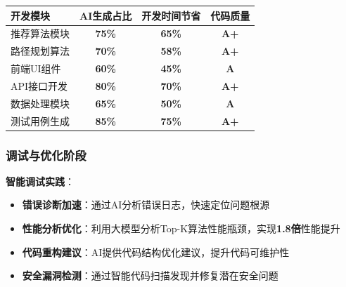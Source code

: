 \documentclass[12pt,a4paper]{article}
\begin{document}
\begin{table}[H]
\centering
\begin{tcolorbox}[
    colback=light,
    colframe=success,
    title={\textbf{AI辅助代码生成效果统计}},
    coltitle=white,
    colbacktitle=success,
    fonttitle=\bfseries,
    rounded corners=5pt,
    width=0.9\textwidth
]
\begin{tabular}{lccc}
\toprule
\rowcolor{success!20}
\textbf{开发模块} & \textbf{AI生成占比} & \textbf{开发时间节省} & \textbf{代码质量} \\
\midrule
推荐算法模块 & \textcolor{primary}{\textbf{75\%}} & \textcolor{success}{\textbf{65\%}} & \textcolor{success}{\textbf{A+}} \\
\rowcolor{light}
路径规划算法 & \textcolor{primary}{\textbf{70\%}} & \textcolor{success}{\textbf{58\%}} & \textcolor{success}{\textbf{A+}} \\
前端UI组件 & \textcolor{primary}{\textbf{60\%}} & \textcolor{success}{\textbf{45\%}} & \textcolor{success}{\textbf{A}} \\
\rowcolor{light}
API接口开发 & \textcolor{primary}{\textbf{80\%}} & \textcolor{success}{\textbf{70\%}} & \textcolor{success}{\textbf{A+}} \\
数据处理模块 & \textcolor{primary}{\textbf{65\%}} & \textcolor{success}{\textbf{50\%}} & \textcolor{success}{\textbf{A}} \\
\rowcolor{light}
测试用例生成 & \textcolor{primary}{\textbf{85\%}} & \textcolor{success}{\textbf{75\%}} & \textcolor{success}{\textbf{A+}} \\
\bottomrule
\end{tabular}
\end{tcolorbox}
\end{table}

\subsubsection{调试与优化阶段}

\textbf{智能调试实践}：
\begin{itemize}
    \item \textbf{错误诊断加速}：通过AI分析错误日志，快速定位问题根源
    \item \textbf{性能分析优化}：利用大模型分析Top-K算法性能瓶颈，实现\textcolor{success}{\textbf{1.8倍}}性能提升
    \item \textbf{代码重构建议}：AI提供代码结构优化建议，提升代码可维护性
    \item \textbf{安全漏洞检测}：通过智能代码扫描发现并修复潜在安全问题
\end{itemize}
\end{document}
